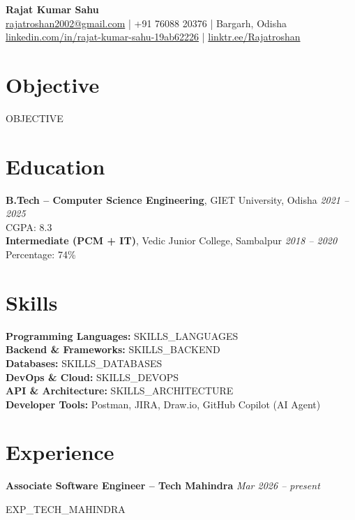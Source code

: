 \documentclass[10pt]{article}
\begin{document}
\begin{center}
    {\Large \textbf{Rajat Kumar Sahu}} \\[0.5em]
    \href{mailto:rajatroshan2002@gmail.com}{rajatroshan2002@gmail.com} \quad | \quad +91 76088 20376 \quad | \quad Bargarh, Odisha \\[0.2em]
    \href{https://www.linkedin.com/in/rajat-kumar-sahu-19ab62226/}{linkedin.com/in/rajat-kumar-sahu-19ab62226} \quad | \quad \href{https://linktr.ee/Rajatroshan}{linktr.ee/Rajatroshan}
\end{center}

\vspace{-1em}
\section*{Objective}
{{OBJECTIVE}}
\vspace{0.5em}

\section*{Education}
\textbf{B.Tech – Computer Science Engineering}, GIET University, Odisha \hfill \textit{2021 – 2025} \\
CGPA: 8.3 \\[-0.4em]

\textbf{Intermediate (PCM + IT)}, Vedic Junior College, Sambalpur \hfill \textit{2018 – 2020} \\
Percentage: 74\%
\vspace{0.5em}

\section*{Skills}
\textbf{Programming Languages:} {{SKILLS_LANGUAGES}} \\
\textbf{Backend \& Frameworks:} {{SKILLS_BACKEND}} \\
\textbf{Databases:} {{SKILLS_DATABASES}} \\
\textbf{DevOps \& Cloud:} {{SKILLS_DEVOPS}} \\
\textbf{API \& Architecture:} {{SKILLS_ARCHITECTURE}} \\
\textbf{Developer Tools:} Postman, JIRA, Draw.io, GitHub Copilot (AI Agent)
\vspace{0.5em}

\section*{Experience}
\textbf{Associate Software Engineer – Tech Mahindra} \hfill \textit{Mar 2026 – present}
\begin{itemize}
{{EXP_TECH_MAHINDRA}}
\end{itemize}
\end{document}
